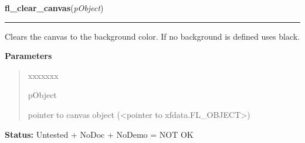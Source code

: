     \label{xformslib:library:fl_clear_canvas}

    \vspace{0.5ex}

\hspace{.8\funcindent}\begin{boxedminipage}{\funcwidth}

    \raggedright \textbf{fl\_clear\_canvas}(\textit{pObject})

    \vspace{-1.5ex}

    \rule{\textwidth}{0.5\fboxrule}
\setlength{\parskip}{2ex}
    Clears the canvas to the background color. If no background is defined 
    uses black.

\setlength{\parskip}{1ex}
      \textbf{Parameters}
      \vspace{-1ex}

      \begin{quote}
        \begin{Ventry}{xxxxxxx}

          \item[pObject]

          pointer to canvas object ({\textless}pointer to 
          xfdata.FL\_OBJECT{\textgreater})

        \end{Ventry}

      \end{quote}

\textbf{Status:} Untested + NoDoc + NoDemo = NOT OK



    \end{boxedminipage}

    \label{xformslib:library:fl_modify_canvas_prop}

    \vspace{0.5ex}

